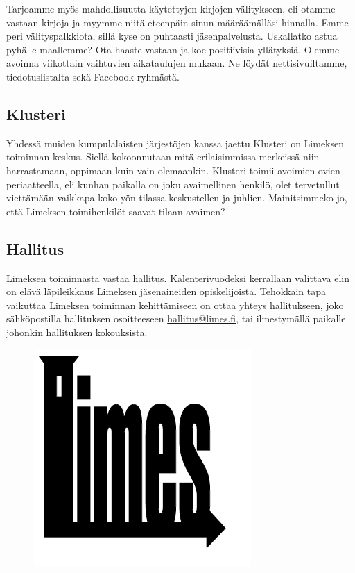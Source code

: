 \documentclass[a5paper, 8pt, twocolumn]{book} %
\numberwithin{equation}{section}
\begin{document}
Tarjoamme myös mahdollisuutta käytettyjen
kirjojen välitykseen, eli otamme
vastaan kirjoja ja myymme niitä eteenpäin
sinun määräämälläsi hinnalla. Emme peri
välityspalkkiota, sillä kyse on puhtaasti jäsenpalvelusta.
Uskallatko astua pyhälle maallemme?
Ota haaste vastaan ja koe positiivisia yllätyksiä.
Olemme avoinna viikottain vaihtuvien
aikataulujen mukaan. Ne löydät
nettisivuiltamme, tiedotuslistalta sekä
Facebook-ryhmästä.

\subsection*{Klusteri}
Yhdessä muiden kumpulalaisten järjestöjen
kanssa jaettu Klusteri on Limeksen
toiminnan keskus. Siellä kokoonnutaan
mitä erilaisimmissa merkeissä niin harrastamaan,
oppimaan kuin vain olemaankin.
Klusteri toimii avoimien ovien periaatteella,
eli kunhan paikalla on joku avaimellinen
henkilö, olet tervetullut viettämään
vaikkapa koko yön tilassa keskustellen ja
juhlien. Mainitsimmeko jo, että Limeksen
toimihenkilöt saavat tilaan avaimen?
\subsection*{Hallitus}
Limeksen toiminnasta vastaa hallitus.
Kalenterivuodeksi kerrallaan valittava
elin on elävä läpileikkaus Limeksen
jäsenaineiden opiskelijoista. Tehokkain
tapa vaikuttaa Limeksen toiminnan kehittämiseen
on ottaa yhteys hallitukseen,
joko sähköpostilla hallituksen osoitteeseen
\url{hallitus@limes.fi}, tai ilmestymällä paikalle
johonkin hallituksen kokouksista.

\begin{figure}[!b]
	\centering\includegraphics[width=0.8\columnwidth]{wanhalimes.png}
\end{figure}
\end{document}
